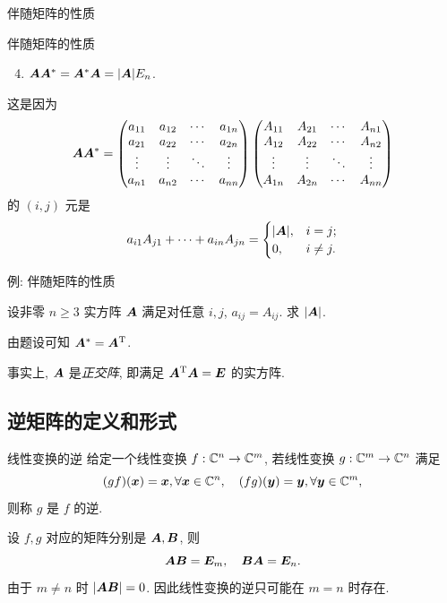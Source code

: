 \begin{frame}{伴随矩阵的性质}
	\begin{second}{伴随矩阵的性质}
		\begin{enumerate}
			\setcounter{enumi}{3}
			\item \alert{${\boldsymbol{A}}{\boldsymbol{A}}^*={\boldsymbol{A}}^*{\boldsymbol{A}}=|{\boldsymbol{A}}|E_n$.}
		\end{enumerate}
	\end{second}
	\onslide<+->
	这是因为
	\[{\boldsymbol{A}}{\boldsymbol{A}}^*=\begin{pmatrix}
		a_{11}&a_{12}&\cdots &a_{1n}\\
		a_{21}&a_{22}&\cdots &a_{2n}\\
		\vdots&\vdots&\ddots&\vdots\\
		a_{n1}&a_{n2}&\cdots &a_{nn}
	\end{pmatrix}\begin{pmatrix}
		A_{11}&A_{21}&\cdots&A_{n1}\\
		A_{12}&A_{22}&\cdots&A_{n2}\\
		\vdots&\vdots&\ddots&\vdots\\
		A_{1n}&A_{2n}&\cdots&A_{nn}
	\end{pmatrix}\]
	\onslide<+->
	的 $(i,j)$ 元是
	\[a_{i1}A_{j1}+\cdots+a_{in}A_{jn}=\begin{cases}
		|{\boldsymbol{A}}|,&i=j;\\
		0,&i\neq j.
	\end{cases}\]
\end{frame}


\begin{frame}{例: 伴随矩阵的性质}
	\onslide<+->
	\begin{example}
		设非零 $n\ge 3$ 实方阵 ${\boldsymbol{A}}$ 满足对任意 $i,j$, $a_{ij}=A_{ij}$. 求 $|{\boldsymbol{A}}|$.
	\end{example}
	\onslide<+->
	\begin{solution}
		由题设可知 ${\boldsymbol{A}}^*={\boldsymbol{A}}^{\mathrm{T}}$.
		\onslide<+->{%
			因此 $|\bfA|=|\bfA^*|=|\bfA|^{n-1}$.
		}

	\end{solution}
	\onslide<+->
	事实上, ${\boldsymbol{A}}$ 是\emph{正交阵}, 即满足 ${\boldsymbol{A}}^{\mathrm{T}}{\boldsymbol{A}}={\boldsymbol{E}}$ 的实方阵.
\end{frame}



\subsection{逆矩阵的定义和形式}
\begin{frame}{线性变换的逆}
	\onslide<+->
	给定一个线性变换 $f:{\mathbb{C}}^n\rightarrow{\mathbb{C}}^m$, 若线性变换 $g:{\mathbb{C}}^m\to{\mathbb{C}}^n$ 满足
	\[(gf)({\boldsymbol{x}})={\boldsymbol{x}},\forall {\boldsymbol{x}}\in{\mathbb{C}}^n,\quad
	(fg)({\boldsymbol{y}})={\boldsymbol{y}},\forall {\boldsymbol{y}}\in{\mathbb{C}}^m,\]
	\onslide<+->
	则称 $g$ 是 $f$ 的逆.

	\onslide<+->
	设 $f,g$ 对应的矩阵分别是 ${\boldsymbol{A}},{\boldsymbol{B}}$, 则
	\[{\boldsymbol{A}}{\boldsymbol{B}}={\boldsymbol{E}}_m,\quad {\boldsymbol{B}}{\boldsymbol{A}}={\boldsymbol{E}}_n.\]
	\onslide<+->
	由于 $m\neq n$ 时 $|{\boldsymbol{A}}{\boldsymbol{B}}|=0$.
	\onslide<+->
	因此线性变换的逆只可能在 $m=n$ 时存在.
\end{frame}


